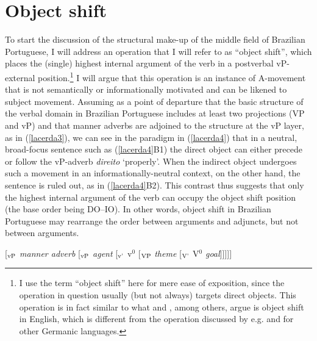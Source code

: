 \documentclass[output=paper]{langscibook}
\begin{document}
\section{Object shift}
To start the discussion of the structural make-up of the middle field of Brazilian Portuguese, I will address an operation that I will refer to as “object shift”, which places the (single) highest internal argument of the verb in a postverbal vP-external position.\footnote{I use the term “object shift” here for mere ease of exposition, since the operation in question usually (but not always) targets direct objects. This operation is in fact similar to what \citet{LasnikSaito1991} and \citet{Boskovic1997}, among others, argue is object shift in English, which is different from the operation discussed by e.g. \citet{Holmberg1986} and \citet{Diesing1996} for other Germanic languages.}  I will argue that this operation is an instance of A-movement that is not semantically or informationally motivated and can be likened to subject movement.
Assuming as a point of departure that the basic structure of the verbal domain in Brazilian Portuguese includes at least two projections (VP and vP) and that manner adverbs are adjoined to the structure at the vP layer, as in (\ref{lacerda3}), we can see in the paradigm in (\ref{lacerda4}) that in a neutral, broad-focus sentence such as (\ref{lacerda4}B1) the direct object can either precede or follow the vP-adverb \emph{direito} ‘properly’. When the indirect object undergoes such a movement in an informationally-neutral context, on the other hand, the sentence is ruled out, as in (\ref{lacerda4}B2). This contrast thus suggests that only the highest internal argument of the verb can occupy the object shift position (the base order being DO–IO). In other words, object shift in Brazilian Portuguese may rearrange the order between arguments and adjuncts, but not between arguments.

\begin{exe}
\ex \label{lacerda3}
[$_{\textnormal{vP}}$ \emph{manner adverb} [$_{\textnormal{vP}}$ \emph{agent} [$_{\textnormal{v'}}$ v$^{0}$ [$_{\textnormal{VP}}$ \emph{theme} [$_{\textnormal{V'}}$ V$^{0}$ \emph{goal}]\hspace{0.5mm}]\hspace{0.5mm}]\hspace{0.5mm}]\hspace{0.5mm}]
\end{exe}
\end{document}
